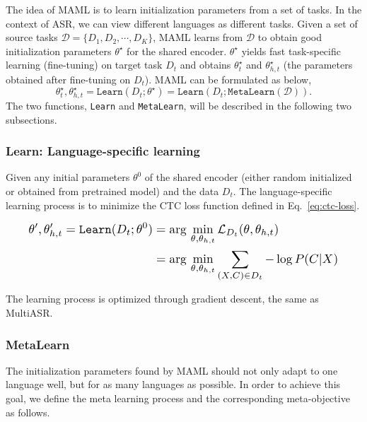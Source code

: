 The idea of MAML is to learn initialization parameters from a set of tasks. 
In the context of ASR, we can view different languages as different tasks.
Given a set of source tasks $\mathcal{D}=\lbrace D_1, D_2, \cdots, D_K \rbrace$, MAML learns from $\mathcal{D}$ to obtain good initialization parameters $\theta^{\star}$ for the shared encoder.
$\theta^{\star}$ yields fast task-specific learning (fine-tuning) on target task $D_t$ and obtains $\theta^{\star}_t$ and $\theta^{\star}_{h,t}$ (the parameters obtained after fine-tuning on $D_t$). 
MAML can be formulated as below, 
\begin{equation*}
  \theta^{\star}_t, \theta^{\star}_{h,t} = \texttt{Learn}(D_t;\theta^{\star}) = \texttt{Learn}(D_t;\texttt{MetaLearn}(\mathcal{D})).
\end{equation*}
The two functions,  \texttt{Learn} and \texttt{MetaLearn}, will be described in the following two subsections.


\subsubsection{Learn: Language-specific learning}
Given any initial parameters $\theta^0$ of the shared encoder (either random initialized or obtained from pretrained model) and the data $D_t$. The language-specific learning process is to minimize the CTC loss function defined in Eq.~\ref{eq:ctc-loss}.

\begin{equation}
  \label{eq:fine-tune}
  \resizebox{0.91\hsize}{!}{$
\begin{aligned}
  \theta^\prime, \theta^\prime_{h,t} = \texttt{Learn}(D_t;\theta^0) & = \arg \, \min_{\theta, \theta_{h,t}} \mathcal{L}_{D_t}(\theta, \theta_{h,t}) \\
                                                                    & = \arg \, \min_{\theta, \theta_{h,t}} \sum_{(X,C) \in D_t} -\log P(C|X)
\end{aligned}
$}
\end{equation}


The learning process is optimized through gradient descent, the same as MultiASR.

\subsubsection{MetaLearn}
The initialization parameters found by MAML should not only adapt to one language well, but for as many languages as possible. In order to achieve this goal, we define the meta learning process and the corresponding meta-objective as follows.

